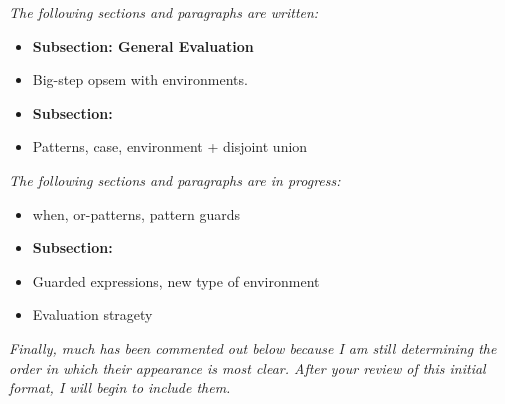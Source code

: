 \documentclass[manuscript,screen,review, 12pt]{acmart}
\begin{document}


\it{The following sections and paragraphs are written:}

\begin{itemize}
    \item \bf{Subsection: General Evaluation}
    \item Big-step opsem with environments. 
    \item \bf{Subsection: \PPlus}
    \item Patterns, case, environment + disjoint union 
\end{itemize}

\it{The following sections and paragraphs are in progress:}
\begin{itemize}
    \item when, or-patterns, pattern guards 
    \item \bf{Subsection: \VMinus}
    \item Guarded expressions, new type of environment
    \item Evaluation stragety 
\end{itemize}

\it{Finally, much has been commented out below because I am still determining
    the order in which their appearance is most clear. After your review of this
    initial format, I will begin to include them.}








\end{document}
